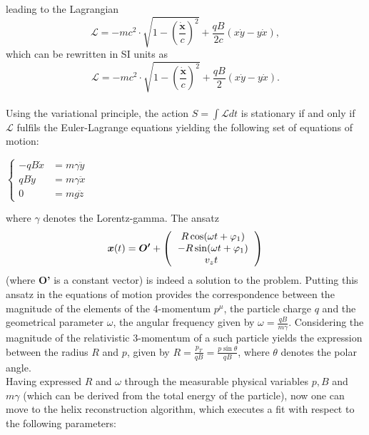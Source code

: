 leading to the Lagrangian
\begin{equation}
	\mathcal{L} = -mc^2\cdot\sqrt{1-\left(\frac{\dot{\boldsymbol{x}}}{c}\right)^2}+\frac{qB}{2c}( x\dot{y} - y\dot{x}),
\end{equation}
which can be rewritten in SI units as
\begin{equation}
	\mathcal{L} = -mc^2\cdot\sqrt{1-\left(\frac{\dot{\boldsymbol{x}}}{c}\right)^2}+\frac{qB}{2}( x\dot{y} - y\dot{x}).
\end{equation}\\
Using the variational principle, the action $S =\int\mathcal{L}dt$ is stationary if and only if $\mathcal{L}$ fulfils the Euler-Lagrange equations yielding the following set of equations of motion:
\begin{center}
	$\left\lbrace
	\begin{aligned}
		-qB\dot{x}&=m\gamma\ddot{y}\\
		qB\dot{y}&=m\gamma\ddot{x}\\
		0&=mg\ddot{z}
	\end{aligned}
	\right.$
\end{center}
where $\gamma$ denotes the Lorentz-gamma. The ansatz
\begin{equation}
	\boldsymbol{x}(t) = \boldsymbol{O'} +  \left(\begin{tabular}{c}
	$R\cos(\omega t + \varphi_1) $\\ 
	$-R\sin(\omega t + \varphi_1) $\\ 
	$v_z t $
	\label{eq:ansatz}
	\end{tabular} \right)
\end{equation}
(where \textbf{O'} is a constant vector) is indeed a solution to the problem. Putting this ansatz in the equations of motion provides the correspondence between the magnitude of the elements of the 4-momentum $p^\mu$, the particle charge $q$ and the geometrical parameter $\omega$, the angular frequency given by $\omega = \frac{qB}{m\gamma}$. Considering the magnitude of the relativistic 3-momentum of a such particle yields the expression between the radius $R$ and $p$, given by $R=\frac{p_T}{qB}=\frac{p\sin\theta}{qB}$, where $\theta$ denotes the polar angle.\\
Having expressed $R$ and $\omega$ through the measurable physical variables $p, B$ and $m\gamma$ (which can be derived from the total energy of the particle), now one can move to the helix reconstruction algorithm, which executes a fit with respect to the following parameters:

